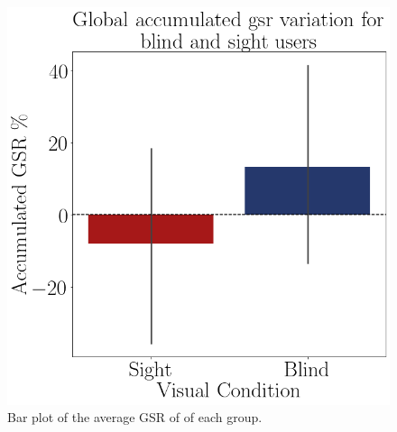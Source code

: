 \begin{figure}[!htb]
\begin{minipage}{.45\linewidth}
        \includegraphics[width = \linewidth]{Resultados/GSR/Figuras/png/barplot_gsr_sum.png}
        \caption{Bar plot of the average GSR of of each group.}
        \label{fig:barplot_gsr_avg}
    \end{minipage}
\end{figure}











\begin{table}[!htb]
    \begin{minipage}{.45\linewidth}
        
    \end{minipage}
    \hfill
    \begin{minipage}{.45\linewidth}
        \vspace{-2.75cm}
        
    \end{minipage}
\end{table}

